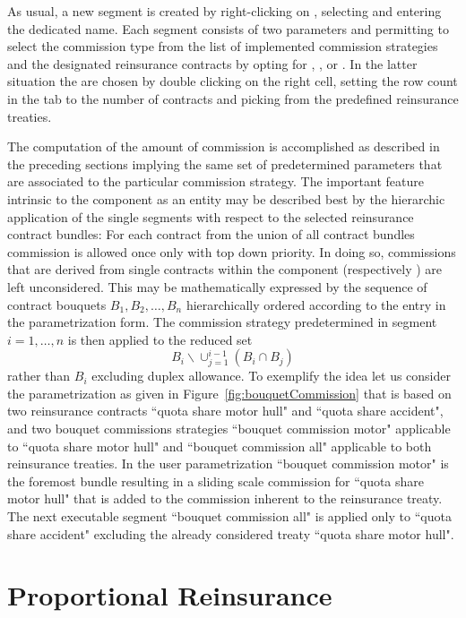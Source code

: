 As usual, a new segment is created by right-clicking on ,
selecting  and entering the dedicated name.
Each segment consists of two parameters 
and  permitting
to select the commission type from the list of implemented commission strategies and the
designated reinsurance contracts by opting for , , or .
In the latter situation the  are chosen by double clicking on the right cell,
setting the row count in the tab to the number of contracts and picking
from the predefined reinsurance treaties.

The computation of the amount of commission is accomplished as described
in the preceding sections implying the same set of
predetermined parameters that are associated to the particular commission strategy.
The important feature intrinsic to the component  as an
entity may be described best by the
hierarchic application of the single segments with respect to the selected reinsurance contract bundles:
For each contract from the union of all contract bundles commission is allowed once only with
top down priority. In doing so, commissions that are derived from single contracts within the component
 (respectively ) are left unconsidered.
This may be mathematically expressed by the sequence of contract bouquets $B_1,B_2,\ldots,B_n$ hierarchically ordered
according to the entry in the parametrization form.
The commission strategy predetermined in segment $i=1,\ldots,n$ is then applied to
the reduced set
\[    B_i\backslash \cup_{j=1}^{i-1}(B_i\cap B_j) \]
rather than $B_i$ excluding duplex allowance.
To exemplify the idea let us consider the parametrization as given in Figure~\ref{fig:bouquetCommission}
that is based on two reinsurance contracts ``quota share motor hull" and  ``quota share accident", and two
bouquet commissions strategies ``bouquet commission motor" applicable to ``quota share motor hull"
and ``bouquet commission all" applicable to both reinsurance treaties.
In the user parametrization ``bouquet commission motor" is the foremost bundle resulting
in a sliding scale commission for ``quota share motor hull" that is added to the
commission inherent to the reinsurance treaty.
 The next executable segment ``bouquet commission all" is applied only to ``quota share accident"
excluding the already considered treaty ``quota share motor hull".

\section{Proportional Reinsurance}
\label{sec:ProportionalReinsurance}

